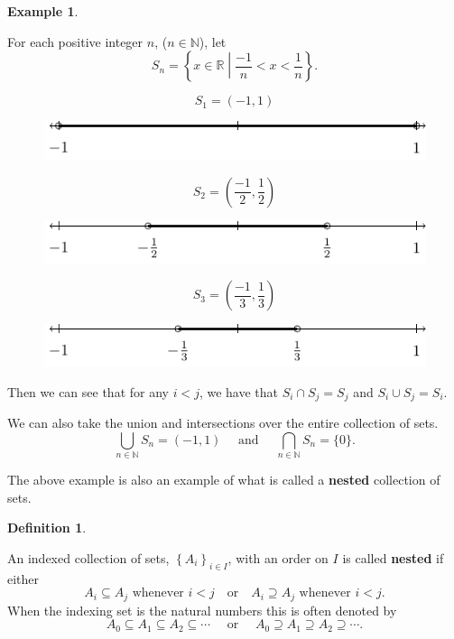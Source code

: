 \documentclass[
]{book}
\theoremstyle{definition}
\newtheorem{definition}{Definition}[chapter]
\theoremstyle{definition}
\newtheorem{example}{Example}[chapter]
\theoremstyle{definition}
\theoremstyle{definition}
\theoremstyle{remark}
\begin{document}
\begin{example}
\protect\hypertarget{exm:unlabeled-div-20}{}\label{exm:unlabeled-div-20}

For each positive integer \(n\), (\(n\in \mathbb{N}\)), let \[S_n= \left\{x\in \mathbb{R}\middle \vert \frac{-1}{n} < x < \frac{1}{n} \right\}.\]

\[S_1=(-1,1)\]

\begin{figure}

{\centering \includegraphics[width=0.35\linewidth]{tikz/Nested_s1} 

}

\end{figure}

\[S_2=(\frac{-1}{2}, \frac{1}{2})\]

\begin{figure}

{\centering \includegraphics[width=0.35\linewidth]{tikz/Nested_s2} 

}

\end{figure}

\[S_3=(\frac{-1}{3}, \frac{1}{3})\]

\begin{figure}

{\centering \includegraphics[width=0.35\linewidth]{tikz/Nested_s3} 

}

\end{figure}

Then we can see that for any \(i<j\), we have that \(S_i\cap S_j = S_j\) and \(S_i \cup S_j = S_i\).

We can also take the union and intersections over the entire collection of sets.
\[\bigcup_{n\in \mathbb{N}} S_n = (-1,1) \quad \mbox{ and } \quad \bigcap_{n\in \mathbb{N}} S_n = \{0\}.\]

\end{example}

The above example is also an example of what is called a \textbf{nested} collection of sets.

\begin{definition}
\protect\hypertarget{def:nested}{}\label{def:nested}

An indexed collection of sets, \(\left\{ A_i\right\}_{i\in I}\), with an order on \(I\) is called \textbf{nested} if either
\[A_i \subseteq A_j \mbox{ whenever } i<j \quad \mbox{or} \quad A_i \supseteq A_j \mbox{ whenever } i<j.\]
When the indexing set is the natural numbers this is often denoted by \[A_0 \subseteq A_1 \subseteq A_2 \subseteq \cdots \quad \mbox{ or } \quad A_0 \supseteq A_1 \supseteq A_2 \supseteq \cdots.\]

\end{definition}
\end{document}
